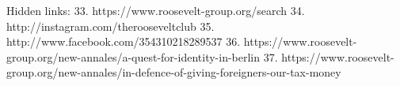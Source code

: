    Hidden links:
  33. https://www.roosevelt-group.org/search
  34. http://instagram.com/therooseveltclub
  35. http://www.facebook.com/354310218289537
  36. https://www.roosevelt-group.org/new-annales/a-quest-for-identity-in-berlin
  37. https://www.roosevelt-group.org/new-annales/in-defence-of-giving-foreigners-our-tax-money
